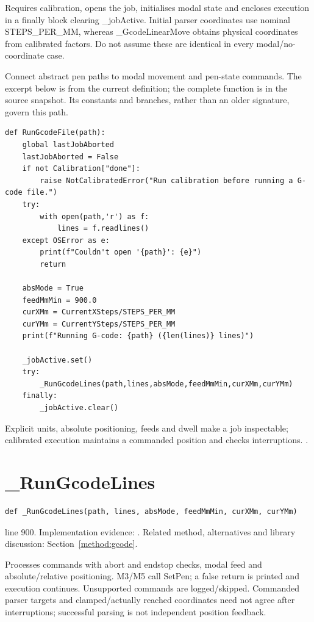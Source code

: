 Requires calibration, opens the job, initialises modal state and encloses execution in a finally block clearing \_jobActive. Initial parser coordinates use nominal STEPS\_PER\_MM, whereas \_GcodeLinearMove obtains physical coordinates from calibrated factors. Do not assume these are identical in every modal/no-coordinate case.


Connect abstract pen paths to modal movement and pen-state commands. The excerpt below is from the current definition; the complete function is in the source snapshot. Its constants and branches, rather than an older signature, govern this path.


\begin{lstlisting}[style=plain]
def RunGcodeFile(path):
    global lastJobAborted
    lastJobAborted = False
    if not Calibration["done"]:
        raise NotCalibratedError("Run calibration before running a G-code file.")
    try:
        with open(path,'r') as f:
            lines = f.readlines()
    except OSError as e:
        print(f"Couldn't open '{path}': {e}")
        return

    absMode = True
    feedMmMin = 900.0
    curXMm = CurrentXSteps/STEPS_PER_MM
    curYMm = CurrentYSteps/STEPS_PER_MM
    print(f"Running G-code: {path} ({len(lines)} lines)")

    _jobActive.set()
    try:
        _RunGcodeLines(path,lines,absMode,feedMmMin,curXMm,curYMm)
    finally:
        _jobActive.clear()
\end{lstlisting}
Explicit units, absolute positioning, feeds and dwell make a job inspectable; calibrated execution maintains a commanded position and checks interruptions. \cite{code2026,linuxcnc}.


\section{\_RunGcodeLines}\label{fn:reproduce:-RunGcodeLines}
\begin{lstlisting}[style=sig]
def _RunGcodeLines(path, lines, absMode, feedMmMin, curXMm, curYMm)
\end{lstlisting}
 line 900. Implementation evidence: \cite{code2026}. Related method, alternatives and library discussion: Section~\ref{method:gcode}.


Processes commands with abort and endstop checks, modal feed and absolute/relative positioning. M3/M5 call SetPen; a false return is printed and execution continues. Unsupported commands are logged/skipped. Commanded parser targets and clamped/actually reached coordinates need not agree after interruptions; successful parsing is not independent position feedback.


